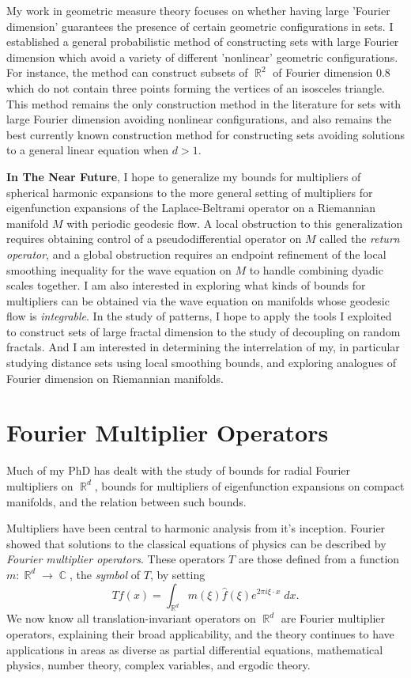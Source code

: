 \documentclass[12pt]{article}
\DeclareMathOperator{\RR}{\mathbb{R}}
\DeclareMathOperator{\CC}{\mathbb{C}}
\begin{document}
My work in geometric measure theory focuses on whether having large 'Fourier dimension' guarantees the presence of certain geometric configurations in sets. I established a general probabilistic method of constructing sets with large Fourier dimension which avoid a variety of different 'nonlinear' geometric configurations. For instance, the method can construct subsets of $\RR^2$ of Fourier dimension $0.8$ which do not contain three points forming the vertices of an isosceles triangle. This method remains the only construction method in the literature for sets with large Fourier dimension avoiding nonlinear configurations, and also remains the best currently known construction method for constructing sets avoiding solutions to a general linear equation when $d > 1$.

{\bf In The Near Future}, I hope to generalize my bounds for multipliers of spherical harmonic expansions to the more general setting of multipliers for eigenfunction expansions of the Laplace-Beltrami operator on a Riemannian manifold $M$ with periodic geodesic flow. A local obstruction to this generalization requires obtaining control of a pseudodifferential operator on $M$ called the \emph{return operator}, and a global obstruction requires an endpoint refinement of the local smoothing inequality for the wave equation on $M$ to handle combining dyadic scales together. I am also interested in exploring what kinds of bounds for multipliers can be obtained via the wave equation on manifolds whose geodesic flow is \emph{integrable}. In the study of patterns, I hope to apply the tools I exploited to construct sets of large fractal dimension to the study of decoupling on random fractals. And I am interested in determining the interrelation of my, in particular studying distance sets using local smoothing bounds, and exploring analogues of Fourier dimension on Riemannian manifolds.

\pagebreak[3]






\section*{Fourier Multiplier Operators}

Much of my PhD has dealt with the study of bounds for radial Fourier multipliers on $\RR^d$, bounds for multipliers of eigenfunction expansions on compact manifolds, and the relation between such bounds.

Multipliers have been central to harmonic analysis from it's inception. Fourier showed that solutions to the classical equations of physics can be described by \emph{Fourier multiplier operators}. These operators $T$ are those defined from a function $m: \RR^d \to \CC$, the \emph{symbol} of $T$, by setting
%
\[ Tf(x) = \int_{\RR^d} m(\xi) \widehat{f}(\xi) e^{2 \pi i \xi \cdot x}\; dx. \]
%
We now know all translation-invariant operators on $\RR^d$ are Fourier multiplier operators, explaining their broad applicability, and the theory continues to have applications in areas as diverse as partial differential equations, mathematical physics, number theory, complex variables, and ergodic theory.
\end{document}
